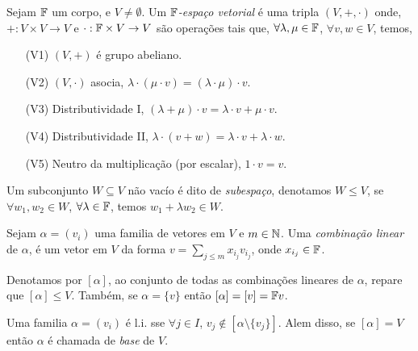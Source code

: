 \begin{definition}
   Sejam \(\mathbb{F}\) um corpo, e \(V\neq \emptyset\). Um \(\mathbb{F}\)\emph{-espaço vetorial} é uma tripla \((V,+,\cdot)\) onde, \(+:V\times V \to V\) e \(\cdot : \mathbb{F} \times V \to V\) são operações tais que, \(\forall \lambda, \mu \in \mathbb{F}\), \(\forall v, w \in V\), temos, 
   \begin{enumerate}[left =1.7cm]
        \item[(V1)] \((V,+)\) é grupo abeliano.  
        \item[(V2)] \((V,\cdot)\) asocia, \(\lambda \cdot(\mu \cdot v) = (\lambda \cdot \mu) \cdot v\).  
        \item[(V3)] Distributividade I, \((\lambda + \mu ) \cdot v = \lambda \cdot v + \mu\cdot  v\).  
        \item[(V4)] Distributividade II, \(\lambda \cdot (v+ w) = \lambda \cdot v + \lambda \cdot w\).  
        \item[(V5)] Neutro da multiplicação (por escalar), \(1 \cdot v = v \).  
   \end{enumerate}
\end{definition}

\begin{definition}
    Um subconjunto \(W \subseteq V\) não vacío é dito de \emph{subespaço}, denotamos \(W\leq V\), se \(\forall w_1, w_2 \in W\), \(\forall \lambda \in \mathbb{F}\), temos \( w_1 + \lambda w_2 \in W \).   
\end{definition}

\begin{definition}
    Sejam \(\alpha = (v_i)\) uma familia de vetores em \(V\) e \(m\in \mathbb{N}\). Uma \emph{combinação linear} de \(\alpha\), é um vetor em \(V\) da forma \(v = \sum_{j\leq m} x_{i_j}v_{i_j}\), onde \(x_{i_j} \in \mathbb{F}\).
\end{definition}

\begin{note}
    Denotamos por \([\alpha]\), ao conjunto de todas as combinações lineares de \(\alpha\), repare que \([\alpha]\leq V\). Também, se \(\alpha = \{v\}\) então \([\alpha] = [v] = \mathbb{F} v\). 
\end{note}

\begin{definition}
    Uma familia \(\alpha = (v_i)\) é l.i. sse \(\forall j \in I\), \(v_j \notin [\alpha \setminus \{v_j\}]\). Alem disso, se \([\alpha] = V\) então \(\alpha\) é chamada de \emph{base} de \(V\). 
\end{definition}

